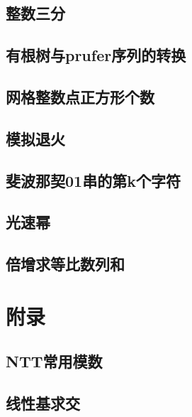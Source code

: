 ﻿\documentclass[a4paper,twocolumn]{article}
\begin{document}
\subsection{整数三分}

\subsection{有根树与prufer序列的转换}

\subsection{网格整数点正方形个数}

\subsection{模拟退火}

\subsection{斐波那契01串的第k个字符}

\subsection{光速幂}

\subsection{倍增求等比数列和}

\section{附录}
\subsection{NTT常用模数}
\begin{spacing}{1.5}

\end{spacing}
\subsection{线性基求交}

\end{document}
